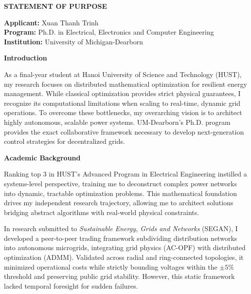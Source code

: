 \documentclass[12pt,letterpaper]{article}
\begin{document}
\noindent

\vspace{3ex}

\begin{center}
    \Large \textbf{STATEMENT OF PURPOSE}
\end{center}

\vspace{2ex}

\noindent \textbf{Applicant:} Xuan Thanh Trinh\\
\noindent \textbf{Program:} Ph.D. in Electrical, Electronics and Computer Engineering\\
\noindent \textbf{Institution:} University of Michigan-Dearborn

\vspace{3ex}

\noindent \textbf{Introduction}

As a final-year student at Hanoi University of Science and Technology (HUST), my research focuses on distributed mathematical optimization for resilient energy management. While classical optimization provides strict physical guarantees, I recognize its computational limitations when scaling to real-time, dynamic grid operations. To overcome these bottlenecks, my overarching vision is to architect highly autonomous, scalable power systems. UM-Dearborn’s Ph.D. program provides the exact collaborative framework necessary to develop next-generation control strategies for decentralized grids.

\vspace{1ex}
\noindent \textbf{Academic Background}

Ranking top 3 in HUST's Advanced Program in Electrical Engineering instilled a systems-level perspective, training me to deconstruct complex power networks into dynamic, tractable optimization problems. This mathematical foundation drives my independent research trajectory, allowing me to architect solutions bridging abstract algorithms with real-world physical constraints.

In research submitted to \textit{Sustainable Energy, Grids and Networks} (SEGAN), I developed a peer-to-peer trading framework subdividing distribution networks into autonomous microgrids, integrating grid physics (AC-OPF) with distributed optimization (ADMM). Validated across radial and ring-connected topologies, it minimized operational costs while strictly bounding voltages within the $\pm 5\%$ threshold and preserving public grid stability. However, this static framework lacked temporal foresight for sudden failures.
\end{document}
